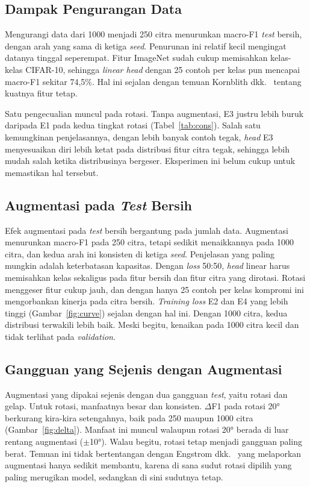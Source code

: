 \documentclass[conference]{IEEEtran}
\begin{document}
\subsection{Dampak Pengurangan Data}

Mengurangi data dari 1000 menjadi 250 citra menurunkan macro-F1 \emph{test} bersih, dengan arah yang sama di ketiga \emph{seed}. Penurunan ini relatif kecil mengingat datanya tinggal seperempat. Fitur ImageNet sudah cukup memisahkan kelas-kelas CIFAR-10, sehingga \emph{linear head} dengan 25 contoh per kelas pun mencapai macro-F1 sekitar 74,5\%. Hal ini sejalan dengan temuan Kornblith dkk.\ \cite{kornblith2019better} tentang kuatnya fitur tetap.

Satu pengecualian muncul pada rotasi. Tanpa augmentasi, E3 justru lebih buruk daripada E1 pada kedua tingkat rotasi (Tabel~\ref{tab:cons}). Salah satu kemungkinan penjelasannya, dengan lebih banyak contoh tegak, \emph{head} E3 menyesuaikan diri lebih ketat pada distribusi fitur citra tegak, sehingga lebih mudah salah ketika distribusinya bergeser. Eksperimen ini belum cukup untuk memastikan hal tersebut.

\subsection{Augmentasi pada \emph{Test} Bersih}

Efek augmentasi pada \emph{test} bersih bergantung pada jumlah data. Augmentasi menurunkan macro-F1 pada 250 citra, tetapi sedikit menaikkannya pada 1000 citra, dan kedua arah ini konsisten di ketiga \emph{seed}. Penjelasan yang paling mungkin adalah keterbatasan kapasitas. Dengan \emph{loss} 50:50, \emph{head} linear harus memisahkan kelas sekaligus pada fitur bersih dan fitur citra yang dirotasi. Rotasi menggeser fitur cukup jauh, dan dengan hanya 25 contoh per kelas kompromi ini mengorbankan kinerja pada citra bersih. \emph{Training loss} E2 dan E4 yang lebih tinggi (Gambar~\ref{fig:curve}) sejalan dengan hal ini. Dengan 1000 citra, kedua distribusi terwakili lebih baik. Meski begitu, kenaikan pada 1000 citra kecil dan tidak terlihat pada \emph{validation}.

\subsection{Gangguan yang Sejenis dengan Augmentasi}

Augmentasi yang dipakai sejenis dengan dua gangguan \emph{test}, yaitu rotasi dan gelap. Untuk rotasi, manfaatnya besar dan konsisten. $\Delta$F1 pada rotasi 20° berkurang kira-kira setengahnya, baik pada 250 maupun 1000 citra (Gambar~\ref{fig:delta}). Manfaat ini muncul walaupun rotasi 20° berada di luar rentang augmentasi ($\pm$10°). Walau begitu, rotasi tetap menjadi gangguan paling berat. Temuan ini tidak bertentangan dengan Engstrom dkk.\ \cite{engstrom2019spatial} yang melaporkan augmentasi hanya sedikit membantu, karena di sana sudut rotasi dipilih yang paling merugikan model, sedangkan di sini sudutnya tetap.
\end{document}
